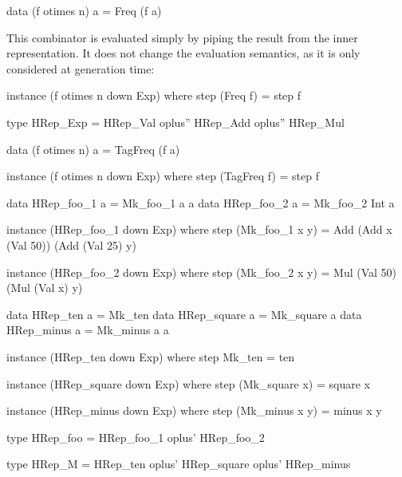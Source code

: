 \begin{code}
data (f otimes n) a = Freq (f a)
\end{code}

This combinator is evaluated simply by piping the result from the inner
representation.
%
It does not change the evaluation semantics, as it is only considered at
generation time:

\begin{code}
instance (f otimes n down Exp) where
  step (Freq f) = step f
\end{code}


\begin{code}
type HRep_Exp  = HRep_Val oplus'' HRep_Add oplus'' HRep_Mul
\end{code}


\begin{code}
data (f otimes n) a = TagFreq (f a)

instance (f otimes n down Exp) where
  step (TagFreq f) = step f
\end{code}


\begin{code}
data HRep_foo_1  a = Mk_foo_1 a a
data HRep_foo_2  a = Mk_foo_2 Int a
\end{code}

\begin{code}
instance (HRep_foo_1 down Exp) where
  step (Mk_foo_1 x y)
    = Add (Add x (Val 50)) (Add (Val 25) y)

instance (HRep_foo_2 down Exp) where
  step (Mk_foo_2 x y)
    = Mul (Val 50) (Mul (Val x) y)
\end{code}

\begin{code}
data HRep_ten       a = Mk_ten
data HRep_square    a = Mk_square   a
data HRep_minus     a = Mk_minus    a a
\end{code}

\begin{code}
instance (HRep_ten down Exp) where
  step Mk_ten = ten

instance (HRep_square down Exp) where
  step (Mk_square x) = square x

instance (HRep_minus down Exp) where
  step (Mk_minus x y) = minus x y
\end{code}


\begin{code}
type HRep_foo  =       HRep_foo_1
               oplus'  HRep_foo_2
\end{code}

\begin{code}
type HRep_M  =       HRep_ten
             oplus'  HRep_square
             oplus'  HRep_minus
\end{code}

